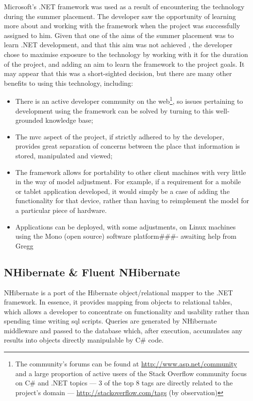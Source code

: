 \documentclass{l4proj}
\newcommand{\revisit}{\#\#\#}
\begin{document}
Microsoft's .NET framework was used as a result of encountering the technology during the summer placement.  The developer saw the opportunity of learning more about and working with the framework when the project was successfully assigned to him.  Given that one of the aims of the summer placement was to learn .NET development, and that this aim was not achieved \cite{summerPlacementReport}, the developer chose to maximise exposure to the technology by working with it for the duration of the project, and adding an aim to learn the framework to the project goals.  It may appear that this was a short-sighted decision, but there are many other benefits to using this technology, including:
\begin{itemize}
	\item There is an active developer community on the web\footnote{The community's forums can be found at \url{http://www.asp.net/community} and a large proportion of active users of the Stack Overflow community focus on C\# and .NET topics --- 3 of the top 8 tags are directly related to the project's domain --- \url{http://stackoverflow.com/tags} (by observation)}, so issues pertaining to development using the framework can be solved by turning to this well-grounded knowledge base;
	\item The \gls{mvc} aspect of the project, if strictly adhered to by the developer, provides great separation of concerns between the place that information is stored, manipulated and viewed;
	\item The framework allows for portability to other client machines with very little in the way of model adjustment. For example, if a requirement for a mobile or tablet application developed, it would simply be a case of adding the functionality for that device, rather than having to reimplement the model for a particular piece of hardware.
	\item Applications can be deployed, with some adjustments, on Linux machines using the Mono (open source) software platform\revisit - awaiting help from Gregg
\end{itemize}

\subsection{NHibernate \& Fluent NHibernate}
\label{nhibernate}
NHibernate is a port of the Hibernate object/relational mapper to the .NET framework. In essence, it provides mapping from objects to relational tables, which allows a developer to concentrate on functionality and usability rather than spending time writing \gls{sql} scripts. Queries are generated by NHibernate middleware and passed to the database which, after execution, accumulates any results into objects directly manipulable by C\# code. 
\end{document}
